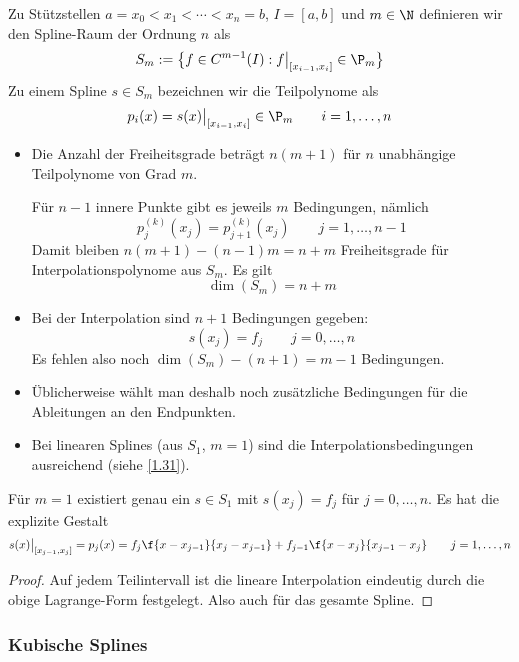 \documentclass[a4paper,11pt]{scrartcl}
\begin{document}
\begin{df}
	\label{1.30}
	Zu Stützstellen $a=x_0 < x_1 < \dotsb < x_n = b$, $I=[a,b]$ und $m\in \N$ definieren wir den Spline-Raum der Ordnung $n$ als
	\[
		S_m := \big\{ f\in C^{m-1}(I) : f\big|_{[x_{i-1},x_i]}\in \P_m\big\}
	\]
	Zu einem Spline $s\in S_m$ bezeichnen wir die Teilpolynome als
	\[
		p_i(x) = s(x)\big|_{[x_{i-1},x_i]} \in \P_m \qquad i=1,\dotsc,n
	\]
\end{df}

\begin{nt*}
	\begin{itemize}
		\item
			Die Anzahl der Freiheitsgrade beträgt $n(m+1)$ für $n$ unabhängige Teilpolynome von Grad $m$.

			Für $n-1$ innere Punkte gibt es jeweils $m$ Bedingungen, nämlich
			\[
				p_j^{(k)}(x_j) = p_{j+1}^{(k)}(x_j) \qquad j=1,\dotsc,n-1
			\]
			Damit bleiben $n(m+1)-(n-1)m = n+m$ Freiheitsgrade für Interpolationspolynome aus $S_m$.
			Es gilt
			\[
				\dim (S_m) = n+m
			\]
		\item
			Bei der Interpolation sind $n+1$ Bedingungen gegeben:
			\[
				s(x_j) = f_j \qquad j=0,\dotsc,n
			\]
			Es fehlen also noch $\dim (S_m) - (n+1) = m-1$ Bedingungen.
		\item
			Üblicherweise wählt man deshalb noch zusätzliche Bedingungen für die Ableitungen an den Endpunkten.
		\item
			Bei linearen Splines (aus $S_1$, $m=1$) sind die Interpolationsbedingungen ausreichend (siehe \ref{1.31}).
	\end{itemize}
\end{nt*}

\begin{st}
	\label{1.31}
	Für $m=1$ existiert genau ein $s\in S_1$ mit $s(x_j) = f_j$ für $j=0,\dotsc,n$.
	Es hat die explizite Gestalt
	\[
		s(x) \big|_{[x_{j-1},x_j]} = p_j(x) = f_j \f {x-x_{j-1}}{x_j - x_{j-1}} + f_{j-1}\f {x-x_j}{x_{j-1}-x_j}
		\qquad j=1,\dotsc,n
	\]
	\begin{proof}
		Auf jedem Teilintervall ist die lineare Interpolation eindeutig durch die obige Lagrange-Form festgelegt.
		Also auch für das gesamte Spline.
	\end{proof}
\end{st}

\subsubsection{Kubische Splines}
\end{document}
